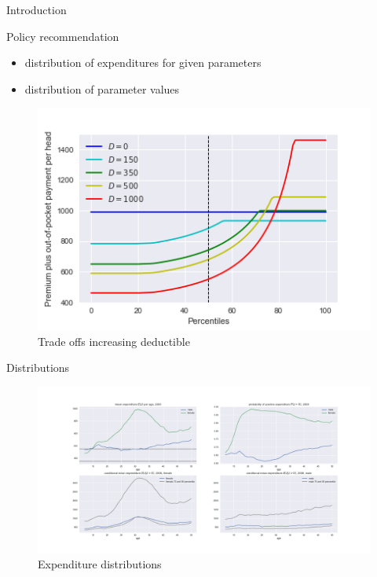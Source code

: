 \documentclass[presentation]{beamer}
\begin{document}
\begin{frame}[label={sec:org8a489c8}]{Introduction}
\begin{block}{Policy recommendation}
\begin{itemize}
\item distribution of expenditures for given parameters
\item distribution of parameter values
\end{itemize}
\begin{figure}[htbp]
\centering
\includegraphics[width=900px]{./deciles_deductible_male_female_Healthy.png}
\caption{Trade offs increasing deductible}
\end{figure}
\end{block}

\begin{block}{Distributions}
\begin{figure}[htbp]
\centering
\includegraphics[width=500px]{./ExpenditureOverAge.png}
\caption{Expenditure distributions}
\end{figure}
\end{block}
\end{frame}
\end{document}
